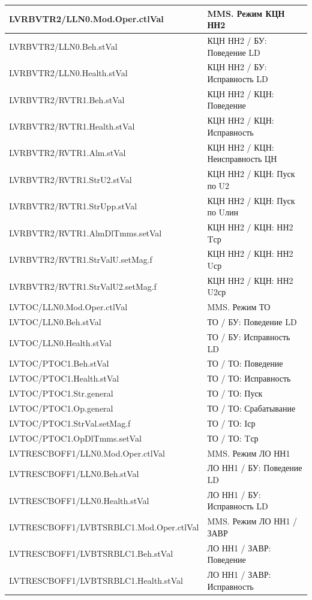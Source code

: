 \begin{longtable}{|>{\raggedright\arraybackslash}m{}|>{\raggedright\arraybackslash}m{}|}
\hline
LVRBVTR2/LLN0.Mod.Oper.ctlVal & MMS. Режим КЦН НН2 \\
\hline
LVRBVTR2/LLN0.Beh.stVal & КЦН НН2 / БУ: Поведение LD \\
\hline
LVRBVTR2/LLN0.Health.stVal & КЦН НН2 / БУ: Исправность LD \\
\hline
LVRBVTR2/RVTR1.Beh.stVal & КЦН НН2 / КЦН: Поведение \\
\hline
LVRBVTR2/RVTR1.Health.stVal & КЦН НН2 / КЦН: Исправность \\
\hline
LVRBVTR2/RVTR1.Alm.stVal & КЦН НН2 / КЦН: Неисправность ЦН \\
\hline
LVRBVTR2/RVTR1.StrU2.stVal & КЦН НН2 / КЦН: Пуск по U2 \\
\hline
LVRBVTR2/RVTR1.StrUpp.stVal & КЦН НН2 / КЦН: Пуск по Uлин \\
\hline
LVRBVTR2/RVTR1.AlmDlTmms.setVal & КЦН НН2 / КЦН: НН2 Tср \\
\hline
LVRBVTR2/RVTR1.StrValU.setMag.f & КЦН НН2 / КЦН: НН2 Uср \\
\hline
LVRBVTR2/RVTR1.StrValU2.setMag.f & КЦН НН2 / КЦН: НН2 U2ср \\
\hline
LVTOC/LLN0.Mod.Oper.ctlVal & MMS. Режим ТО \\
\hline
LVTOC/LLN0.Beh.stVal & ТО / БУ: Поведение LD \\
\hline
LVTOC/LLN0.Health.stVal & ТО / БУ: Исправность LD \\
\hline
LVTOC/PTOC1.Beh.stVal & ТО / ТО: Поведение \\
\hline
LVTOC/PTOC1.Health.stVal & ТО / ТО: Исправность \\
\hline
LVTOC/PTOC1.Str.general & ТО / ТО: Пуск \\
\hline
LVTOC/PTOC1.Op.general & ТО / ТО: Срабатывание \\
\hline
LVTOC/PTOC1.StrVal.setMag.f & ТО / ТО: Iср \\
\hline
LVTOC/PTOC1.OpDlTmms.setVal & ТО / ТО: Tср \\
\hline
LVTRESCBOFF1/LLN0.Mod.Oper.ctlVal & MMS. Режим ЛО НН1 \\
\hline
LVTRESCBOFF1/LLN0.Beh.stVal & ЛО НН1 / БУ: Поведение LD \\
\hline
LVTRESCBOFF1/LLN0.Health.stVal & ЛО НН1 / БУ: Исправность LD \\
\hline
LVTRESCBOFF1/LVBTSRBLC1.Mod.Oper.ctlVal & MMS. Режим ЛО НН1 / ЗАВР \\
\hline
LVTRESCBOFF1/LVBTSRBLC1.Beh.stVal & ЛО НН1 / ЗАВР: Поведение \\
\hline
LVTRESCBOFF1/LVBTSRBLC1.Health.stVal & ЛО НН1 / ЗАВР: Исправность \\

\end{longtable}
